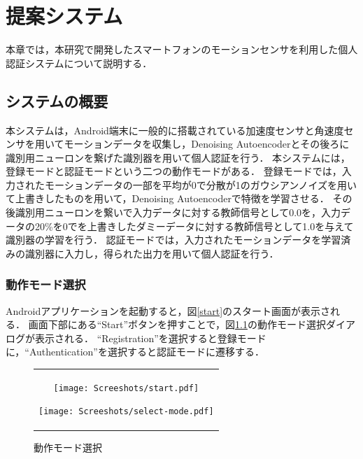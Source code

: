 \chapter{提案システム}
本章では，本研究で開発したスマートフォンのモーションセンサを利用した個人認証システムについて説明する．

\section{システムの概要}
本システムは，Android端末に一般的に搭載されている加速度センサと角速度センサを用いてモーションデータを収集し，Denoising Autoencoderとその後ろに識別用ニューロンを繋げた識別器を用いて個人認証を行う．
本システムには，登録モードと認証モードという二つの動作モードがある．
登録モードでは，入力されたモーションデータの一部を平均が0で分散が1のガウシアンノイズを用いて上書きしたものを用いて，Denoising Autoencoderで特徴を学習させる．
その後識別用ニューロンを繋いで入力データに対する教師信号として0.0を，入力データの20\%を0でを上書きしたダミーデータに対する教師信号として1.0を与えて識別器の学習を行う．
認証モードでは，入力されたモーションデータを学習済みの識別器に入力し，得られた出力を用いて個人認証を行う．

\subsection{動作モード選択}
Androidアプリケーションを起動すると，図\ref{start}のスタート画面が表示される．
画面下部にある``Start''ボタンを押すことで，図\ref{select-mode}の動作モード選択ダイアログが表示される．
``Registration''を選択すると登録モードに，``Authentication''を選択すると認証モードに遷移する．

\begin{figure}[hbtp]
  \centering
  \begin{tabular}{c}
    \begin{minipage}{0.5\hsize}
      \centering
      \texttt{[image: Screeshots/start.pdf]}
      \caption{スタート画面}
      \label{start}
    \end{minipage}
    \begin{minipage}{0.5\hsize}
      \centering
      \texttt{[image: Screeshots/select-mode.pdf]}
      \caption{動作モード選択}
      \label{select-mode}
    \end{minipage}
  \end{tabular}
\end{figure}

